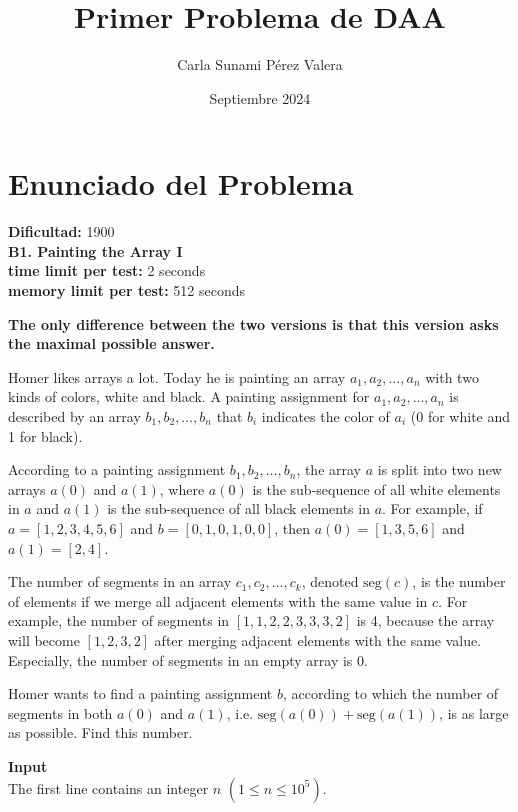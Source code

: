 \documentclass{article}
\title{Primer Problema de DAA}
\author{Carla Sunami Pérez Valera}
\date{Septiembre 2024}
\begin{document}
\maketitle

\section{Enunciado del Problema}

\begin{center}
    \large \textbf{Dificultad:} 1900\\
    \LARGE \textbf{B1. Painting the Array I} \\[0.5em] 
    \large \textbf{time limit per test:} 2 seconds\\
    \large \textbf{memory limit per test:} 512 seconds
    
\end{center}


\textbf{The only difference between the two versions is that this version asks the maximal possible answer.}

Homer likes arrays a lot. Today he is painting an array $a_1, a_2, \ldots, a_n$ with two kinds of colors, white and black. A painting assignment for $a_1, a_2, \ldots, a_n$ is described by an array $b_1, b_2, \ldots, b_n$ that $b_i$ indicates the color of $a_i$ (0 for white and 1 for black).

According to a painting assignment $b_1, b_2, \ldots, b_n$, the array $a$ is split into two new arrays $a{(0)}$ and $a{(1)}$, where $a{(0)}$ is the sub-sequence of all white elements in $a$ and $a{(1)}$ is the sub-sequence of all black elements in $a$. For example, if $a=[1,2,3,4,5,6]$ and $b=[0,1,0,1,0,0]$, then $a{(0)}=[1,3,5,6]$ and $a{(1)}=[2,4]$.

The number of segments in an array $c_1, c_2, \ldots, c_k$, denoted $\text{seg}(c)$, is the number of elements if we merge all adjacent elements with the same value in $c$. For example, the number of segments in $[1,1,2,2,3,3,3,2]$ is 4, because the array will become $[1,2,3,2]$ after merging adjacent elements with the same value. Especially, the number of segments in an empty array is 0.

Homer wants to find a painting assignment $b$, according to which the number of segments in both $a{(0)}$ and $a{(1)}$, i.e. $\text{seg}(a{(0)})+\text{seg}(a{(1)})$, is as large as possible. Find this number.



\large \textbf{Input}\\
The first line contains an integer $n$ $(1 \leq n \leq 10^5)$.
\end{document}
